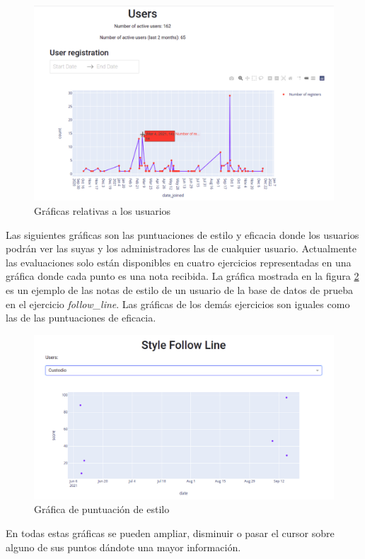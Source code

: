 \begin{figure}[H]
    \centering
    \includegraphics[width=17cm, keepaspectratio]{img/users.png}
    \caption{Gráficas relativas a los usuarios}
    \label{fig:users}
\end{figure}

\newpage
Las siguientes gráficas son las puntuaciones de estilo y eficacia donde los usuarios podrán ver las suyas y los administradores las de cualquier usuario. Actualmente las evaluaciones solo están disponibles en cuatro ejercicios representadas en una gráfica donde cada punto es una nota recibida. La gráfica mostrada en la figura \ref{fig:score} es un ejemplo de las notas de estilo de un usuario de la base de datos de prueba en el ejercicio \textit{follow\_line}. Las gráficas de los demás ejercicios son iguales como las de las puntuaciones de eficacia.



\begin{figure}[H]
    \centering
    \includegraphics[width=17cm, keepaspectratio]{img/score.png}
    \caption{Gráfica de puntuación de estilo}
    \label{fig:score}
\end{figure}

En todas estas gráficas se pueden ampliar, disminuir o pasar el cursor sobre alguno de sus puntos dándote una mayor información.









